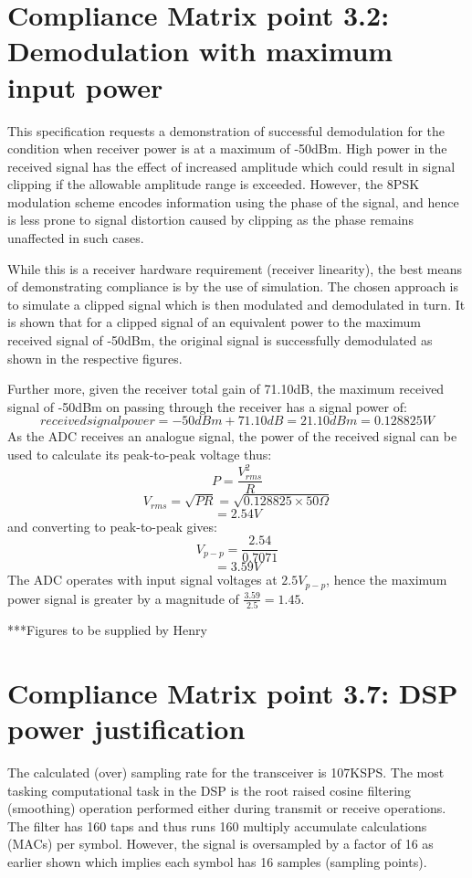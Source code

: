\section{Compliance Matrix point 3.2: Demodulation with maximum input power}
This specification requests a demonstration of successful demodulation for the condition when receiver power is at a maximum of -50dBm.  High power in the received signal has the effect of increased amplitude which could result in signal clipping if the allowable amplitude range is exceeded.  However, the 8PSK modulation scheme encodes information using the phase of the signal, and hence is less prone to signal distortion caused by clipping as the phase remains unaffected in such cases.

While this is a receiver hardware requirement (receiver linearity), the best means of demonstrating compliance is by the use of simulation.  The chosen approach is to simulate a clipped signal which is then modulated and demodulated in turn.  It is shown that for a clipped signal of an equivalent power to the maximum received signal of -50dBm, the original signal is successfully demodulated as shown in the respective figures.

Further more, given the receiver total gain of 71.10dB, the maximum received signal of -50dBm on passing through the receiver has a signal power of:
	\[  received signal power = -50dBm + 71.10dB = 21.10dBm = 0.128825 W 		\]
As the ADC receives an analogue signal, the power of the received signal can be used to calculate its peak-to-peak voltage thus:
	\[  P = \frac{V_{rms}^2}{R} \]
	\[	V_{rms} = \sqrt{P R} = \sqrt{0.128825 \times 50\Omega} \]
	\[			= 2.54V  \]
and converting to peak-to-peak gives:
	\[	V_{p-p}	= \frac{2.54}{0.7071}   \]
	\[			= 3.59V \]
The ADC operates with input signal voltages at \(2.5V_{p-p}\), hence the maximum power signal is greater by a magnitude of \( \frac{3.59}{2.5} = 1.45 \).  

***Figures to be supplied by Henry


\section{Compliance Matrix point 3.7: DSP power justification}
The calculated (over) sampling rate for the transceiver is 107KSPS. The most tasking computational task in the DSP is the root raised cosine filtering (smoothing) operation performed either during transmit or receive operations.  The filter has 160 taps and thus runs 160 multiply accumulate calculations (MACs) per symbol.  However, the signal is oversampled by a factor of 16 as earlier shown which implies each symbol has 16 samples (sampling points).

